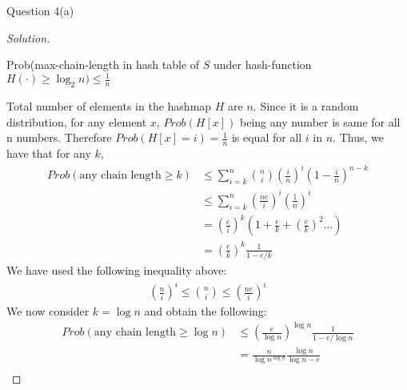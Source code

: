 \begin{solution}{Question 4(a)}\label{ques:41}
    \begin{question}
        
    \end{question}
    \tcblower{}
    \begin{proof}[Solution]
        \begin{claim}\label{claim:q1}
        Prob(max-chain-length in hash table of $S$ under hash-function $H(\cdot)\geq \log_2 n) \leq \frac{1}{n}$
        \end{claim}
        Total number of elements in the hashmap $H$ are $n$. Since it is a random distribution, for any element $x$, $Prob(H[x])$ being any number is same for all n numbers. Therefore $Prob(H[x]=i)=\frac{1}{n}$ is equal for all $i$ in $n$. Thus, we have that for any $k$,
        \begin{equation}
            \begin{split}
                Prob(\text{any chain length} \geq k) &\leq\sum_{i=k}^n \binom{n}{i}\left(\frac{i}{n}\right)^i \left(1 - \frac{i}{n}\right)^{n-k}\\
                                                 &\leq\sum_{i=k}^n \left(\frac{ne}{i}\right)^i\left(\frac{1}{n}\right)^i\\
                                                 &= \left(\frac{e}{i}\right)^k\left(1 + \frac{e}{k} + \left(\frac{e}{k}\right)^2 \ldots \right)\\
                                                 &= \left(\frac{e}{k}\right)^k \frac{1}{1-e/k}
            \end{split}
        \end{equation}
        We have used the following inequality above:
        \begin{equation}
            \begin{split}
                \left( \frac{n}{i} \right)^i \leq \binom n i \leq \left( \frac{ne}{i} \right)^i            \end{split}
        \end{equation}
        We now consider $k=\log{n}$ and obtain the following:
        \begin{equation}\label{eq:prob}
            \begin{split}
                Prob(\text{any chain length} \geq \log{n}) &\leq \left(\frac{e}{\log{n}}\right)^{\log{n}} \frac{1}{1-e/\log{n}}\\
                                                     &=\frac{n}{\log{n}^{\log{n}}} \frac{\log{n}}{\log{n}-e}\\

\end{split}
\end{equation}
\end{proof}
\end{solution}
